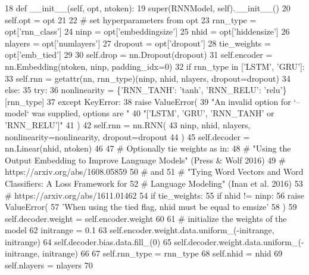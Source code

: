 \begin{DoxyCode}
18     \textcolor{keyword}{def }\_\_init\_\_(self, opt, ntoken):
19         super(RNNModel, self).\_\_init\_\_()
20         self.opt = opt
21 
22         \textcolor{comment}{# set hyperparameters from opt}
23         rnn\_type = opt[\textcolor{stringliteral}{'rnn\_class'}]
24         ninp = opt[\textcolor{stringliteral}{'embeddingsize'}]
25         nhid = opt[\textcolor{stringliteral}{'hiddensize'}]
26         nlayers = opt[\textcolor{stringliteral}{'numlayers'}]
27         dropout = opt[\textcolor{stringliteral}{'dropout'}]
28         tie\_weights = opt[\textcolor{stringliteral}{'emb\_tied'}]
29 
30         self.drop = nn.Dropout(dropout)
31         self.encoder = nn.Embedding(ntoken, ninp, padding\_idx=0)
32         \textcolor{keywordflow}{if} rnn\_type \textcolor{keywordflow}{in} [\textcolor{stringliteral}{'LSTM'}, \textcolor{stringliteral}{'GRU'}]:
33             self.rnn = getattr(nn, rnn\_type)(ninp, nhid, nlayers, dropout=dropout)
34         \textcolor{keywordflow}{else}:
35             \textcolor{keywordflow}{try}:
36                 nonlinearity = \{\textcolor{stringliteral}{'RNN\_TANH'}: \textcolor{stringliteral}{'tanh'}, \textcolor{stringliteral}{'RNN\_RELU'}: \textcolor{stringliteral}{'relu'}\}[rnn\_type]
37             \textcolor{keywordflow}{except} KeyError:
38                 \textcolor{keywordflow}{raise} ValueError(
39                     \textcolor{stringliteral}{"An invalid option for `--model` was supplied, options are "}
40                     \textcolor{stringliteral}{"['LSTM', 'GRU', 'RNN\_TANH' or 'RNN\_RELU']"}
41                 )
42             self.rnn = nn.RNN(
43                 ninp, nhid, nlayers, nonlinearity=nonlinearity, dropout=dropout
44             )
45         self.decoder = nn.Linear(nhid, ntoken)
46 
47         \textcolor{comment}{# Optionally tie weights as in:}
48         \textcolor{comment}{# "Using the Output Embedding to Improve Language Models" (Press & Wolf 2016)}
49         \textcolor{comment}{# https://arxiv.org/abs/1608.05859}
50         \textcolor{comment}{# and}
51         \textcolor{comment}{# "Tying Word Vectors and Word Classifiers: A Loss Framework for}
52         \textcolor{comment}{#   Language Modeling" (Inan et al. 2016)}
53         \textcolor{comment}{# https://arxiv.org/abs/1611.01462}
54         \textcolor{keywordflow}{if} tie\_weights:
55             \textcolor{keywordflow}{if} nhid != ninp:
56                 \textcolor{keywordflow}{raise} ValueError(
57                     \textcolor{stringliteral}{'When using the tied flag, nhid must be equal to emsize'}
58                 )
59             self.decoder.weight = self.encoder.weight
60 
61         \textcolor{comment}{# initialize the weights of the model}
62         initrange = 0.1
63         self.encoder.weight.data.uniform\_(-initrange, initrange)
64         self.decoder.bias.data.fill\_(0)
65         self.decoder.weight.data.uniform\_(-initrange, initrange)
66 
67         self.rnn\_type = rnn\_type
68         self.nhid = nhid
69         self.nlayers = nlayers
70 
\end{DoxyCode}


